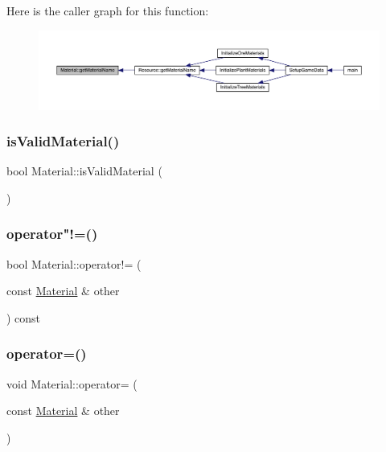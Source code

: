 Here is the caller graph for this function\+:
\nopagebreak
\begin{figure}[H]
\begin{center}
\leavevmode
\includegraphics[width=350pt]{class_material_a6259941981c91ac2f0c0baa0dd53c160_icgraph}
\end{center}
\end{figure}
\mbox{\label{class_material_a5701802cfadd1ded2f934f15b3f018c9}} 
\subsubsection{\texorpdfstring{is\+Valid\+Material()}{isValidMaterial()}}
{\footnotesize\ttfamily bool Material\+::is\+Valid\+Material (\begin{DoxyParamCaption}{ }\end{DoxyParamCaption})}

\mbox{\label{class_material_a16d6175216c74057b2eab09ccaa7986c}} 
\subsubsection{\texorpdfstring{operator"!=()}{operator!=()}}
{\footnotesize\ttfamily bool Material\+::operator!= (\begin{DoxyParamCaption}\item[{const \mbox{\hyperlink{class_material}{Material}} \&}]{other }\end{DoxyParamCaption}) const}

\mbox{\label{class_material_a0c841562a07082c43d64f7fa9477eb44}} 
\subsubsection{\texorpdfstring{operator=()}{operator=()}}
{\footnotesize\ttfamily void Material\+::operator= (\begin{DoxyParamCaption}\item[{const \mbox{\hyperlink{class_material}{Material}} \&}]{other }\end{DoxyParamCaption})}

